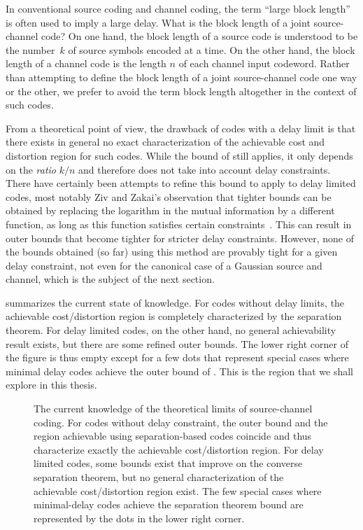 \begin{remark}
  \label{rem:blocklength}
  In conventional source coding and channel coding, the term ``large block
  length'' is often used to imply a large delay. What is the block length of a
  joint source-channel code? On one hand, the block length of a source code is
  understood to be the number~$k$ of source symbols encoded at a time. On the
  other hand, the block length of a channel code is the length $n$ of each
  channel input codeword. Rather than attempting to define the block length of a
  joint source-channel code one way or the other, we prefer to avoid the term
  block length altogether in the context of such codes. 
\end{remark}

From a theoretical point of view, the drawback of codes with a delay limit is
that there exists in general no exact characterization of the achievable cost
and distortion region for such codes. While the bound of
 still applies, it only depends on the \emph{ratio}
$k/n$ and therefore does not take into account delay constraints. There have
certainly been attempts to refine this bound to apply to delay limited codes,
most notably Ziv and Zakai's observation that tighter bounds can be obtained by
replacing the logarithm in the mutual information by a different function, as
long as this function satisfies certain constraints~\cite{ZivZ1973}. This can
result in outer bounds that become tighter for stricter delay constraints.
However, none of the bounds obtained (so far) using this method are provably
tight for a given delay constraint, not even for the canonical case of a
Gaussian source and channel, which is the subject of the next section.

 summarizes the current state of knowledge. For codes
without delay limits, the achievable cost/distortion region is completely
characterized by the separation theorem. For delay limited
codes, on the other hand, no general achievability result exists, but there are
some refined outer bounds. The lower right corner of the figure is thus empty
except for a few dots that represent special cases where minimal delay codes
achieve the outer bound of . This is the region that
we shall explore in this thesis. 

\begin{figure}
  \begin{center}
    
  \end{center}
  \caption{The current knowledge of the theoretical limits of source-channel
  coding. For codes without delay constraint, the outer bound and the
  region achievable using separation-based codes coincide and thus characterize
  exactly the achievable cost/distortion region. For delay limited codes, some
  bounds exist that improve on the converse separation theorem, but no general
  characterization of the achievable cost/distortion region exist. The few
  special cases where minimal-delay codes achieve the separation theorem bound
  are represented by the dots in the lower right corner.}
  \label{fig:achievableregions}
\end{figure}



